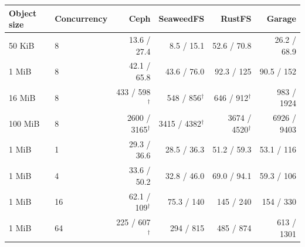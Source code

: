 \begin{tabular}{llrrrr}
\toprule
Object size & Concurrency & Ceph & SeaweedFS & RustFS & Garage \\
\midrule
50 KiB & 8 & 13.6 / 27.4 & 8.5 / 15.1 & 52.6 / 70.8 & 26.2 / 68.9 \\
1 MiB & 8 & 42.1 / 65.8 & 43.6 / 76.0 & 92.3 / 125 & 90.5 / 152 \\
16 MiB & 8 & 433 / 598$^{\dagger}$ & 548 / 856$^{\dagger}$ & 646 / 912$^{\dagger}$ & 983 / 1924 \\
100 MiB & 8 & 2600 / 3165$^{\dagger}$ & 3415 / 4382$^{\dagger}$ & 3674 / 4520$^{\dagger}$ & 6926 / 9403 \\
\midrule
1 MiB & 1 & 29.3 / 36.6 & 28.5 / 36.3 & 51.2 / 59.3 & 53.1 / 116 \\
1 MiB & 4 & 33.6 / 50.2 & 32.8 / 46.0 & 69.0 / 94.1 & 59.3 / 106 \\
1 MiB & 16 & 62.1 / 109$^{\dagger}$ & 75.3 / 140 & 145 / 240 & 154 / 330 \\
1 MiB & 64 & 225 / 607$^{\dagger}$ & 294 / 815 & 485 / 874 & 613 / 1301 \\
\bottomrule
\end{tabular}
